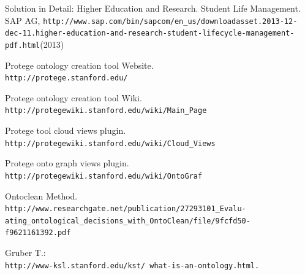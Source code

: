 \documentclass{article}    %
\begin{document}
%
%
\begin{thebibliography}{99}
%
Solution in Detail: Higher Education and Research. Student Life Management.
SAP AG, \texttt{http://www.sap.com/bin/sapcom/en\_us/downloadasset.2013-12-dec-11.higher-education-and-research-student-lifecycle-\newline management-pdf.html}(2013)

Protege ontology creation tool Website.\\
\texttt{http://protege.stanford.edu/}

Protege ontology creation tool Wiki.\\
\texttt{http://protegewiki.stanford.edu/wiki/Main\_Page}

Protege tool cloud views plugin.\\
\texttt{http://protegewiki.stanford.edu/wiki/Cloud\_Views}

Protege onto graph views plugin.\\
\texttt{http://protegewiki.stanford.edu/wiki/OntoGraf}

Ontoclean Method.\\
\texttt{http://www.researchgate.net/publication/27293101\_Evalu-\newline
ating\_ontological\_decisions\_with\_OntoClean/file/9fcfd50-\newline
f9621161392.pdf}

Gruber T.:
\\
\texttt{http://www-ksl.stanford.edu/kst/ what-is-an-ontology.html.} 



\end{thebibliography}
\end{document}
